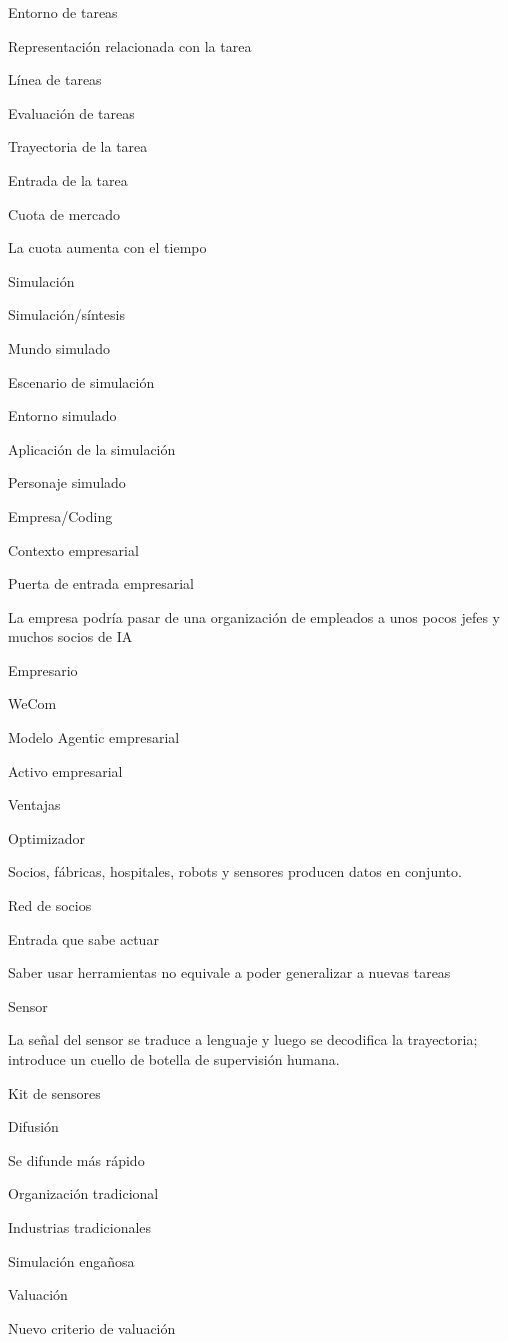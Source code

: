 \documentclass{article}
\begin{document}
Entorno de tareas

Representación relacionada con la tarea

Línea de tareas

Evaluación de tareas

Trayectoria de la tarea

Entrada de la tarea

Cuota de mercado

La cuota aumenta con el tiempo

Simulación

Simulación/síntesis

Mundo simulado

Escenario de simulación

Entorno simulado

Aplicación de la simulación

Personaje simulado

Empresa/Coding

Contexto empresarial

Puerta de entrada empresarial

La empresa podría pasar de una organización de empleados a unos pocos jefes y muchos socios de IA

Empresario

WeCom

Modelo Agentic empresarial

Activo empresarial

Ventajas

Optimizador

Socios, fábricas, hospitales, robots y sensores producen datos en conjunto.

Red de socios

Entrada que sabe actuar

Saber usar herramientas no equivale a poder generalizar a nuevas tareas

Sensor

La señal del sensor se traduce a lenguaje y luego se decodifica la trayectoria; introduce un cuello de botella de supervisión humana.

Kit de sensores

Difusión

Se difunde más rápido

Organización tradicional

Industrias tradicionales

Simulación engañosa

Valuación

Nuevo criterio de valuación
\end{document}
